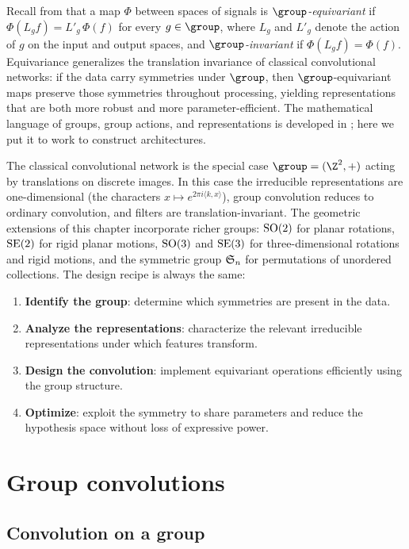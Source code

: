 Recall from  that a map $\Phi$ between spaces of signals is
\emph{$\group$-equivariant} if $\Phi(L_g f) = L'_g\,\Phi(f)$ for every
$g \in \group$, where $L_g$ and $L'_g$ denote the action of $g$ on the input and
output spaces, and \emph{$\group$-invariant} if $\Phi(L_g f) = \Phi(f)$.
Equivariance generalizes the translation invariance of classical convolutional
networks: if the data carry symmetries under $\group$, then $\group$-equivariant
maps preserve those symmetries throughout processing, yielding representations
that are both more robust and more parameter-efficient. The mathematical
language of groups, group actions, and representations is developed in
; here we put it to work to construct architectures.

The classical convolutional network is the special case $\group = (\Z^2, +)$
acting by translations on discrete images. In this case the irreducible
representations are one-dimensional (the characters $x \mapsto e^{2\pi i
\langle k, x\rangle}$), group convolution reduces to ordinary convolution, and
filters are translation-invariant. The geometric extensions of this chapter
incorporate richer groups: $\operatorname{SO}(2)$ for planar rotations, $\operatorname{SE}(2)$ for rigid
planar motions, $\operatorname{SO}(3)$ and $\operatorname{SE}(3)$ for three-dimensional rotations and rigid
motions, and the symmetric group $\mathfrak{S}_n$ for permutations of unordered
collections. The design recipe is always the same:
\begin{enumerate}
  \item \textbf{Identify the group}: determine which symmetries are present in
        the data.
  \item \textbf{Analyze the representations}: characterize the relevant
        irreducible representations under which features transform.
  \item \textbf{Design the convolution}: implement equivariant operations
        efficiently using the group structure.
  \item \textbf{Optimize}: exploit the symmetry to share parameters and reduce
        the hypothesis space without loss of expressive power.
\end{enumerate}

\section{Group convolutions}
\label{sec:groups:convolutions}

\subsection{Convolution on a group}
\label{sec:groups:conv-on-group}

